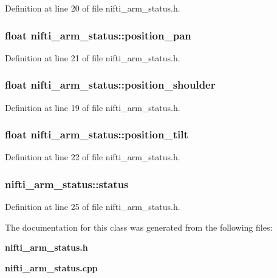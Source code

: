 \-Definition at line 20 of file nifti\-\_\-arm\-\_\-status.\-h.

\subsubsection[{position\-\_\-pan}]{\setlength{\rightskip}{0pt plus 5cm}float {\bf nifti\-\_\-arm\-\_\-status\-::position\-\_\-pan}}\label{classnifti__arm__status_a94efdb062c5ffa8ff1dd6a09d04ea694}


\-Definition at line 21 of file nifti\-\_\-arm\-\_\-status.\-h.

\subsubsection[{position\-\_\-shoulder}]{\setlength{\rightskip}{0pt plus 5cm}float {\bf nifti\-\_\-arm\-\_\-status\-::position\-\_\-shoulder}}\label{classnifti__arm__status_a7d7f6534d12bd52aaecca9d8f882a3fe}


\-Definition at line 19 of file nifti\-\_\-arm\-\_\-status.\-h.

\subsubsection[{position\-\_\-tilt}]{\setlength{\rightskip}{0pt plus 5cm}float {\bf nifti\-\_\-arm\-\_\-status\-::position\-\_\-tilt}}\label{classnifti__arm__status_a5108fc8224761ff0f0273cb46bba85be}


\-Definition at line 22 of file nifti\-\_\-arm\-\_\-status.\-h.

\subsubsection[{status}]{ {\bf nifti\-\_\-arm\-\_\-status\-::status}}\label{classnifti__arm__status_afcc349098ba06de68f0f4946fbebdbfc}


\-Definition at line 25 of file nifti\-\_\-arm\-\_\-status.\-h.



\-The documentation for this class was generated from the following files\-:\begin{DoxyCompactItemize}
\item 
{\bf nifti\-\_\-arm\-\_\-status.\-h}\item 
{\bf nifti\-\_\-arm\-\_\-status.\-cpp}\end{DoxyCompactItemize}
